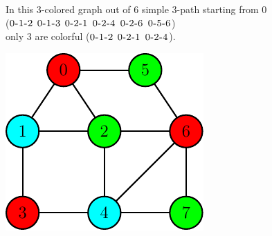 	\begin{minipage}{0.55\textwidth}\raggedright
		\begin{esempio}
		\end{esempio}
		
		In this $3$-colored graph out of $6$ simple $3$-path starting from $0$\\
		($\textsc{0-1-2}$ $\textsc{0-1-3}$ $\textsc{0-2-1}$ $\textsc{0-2-4}$ $\textsc{0-2-6}$ $\textsc{0-5-6}$)\\ 
		only $3$ are colorful ($\textsc{0-1-2}$ $\textsc{0-2-1}$ $\textsc{0-2-4}$).
	\end{minipage}
	\begin{minipage}{0.35\textwidth}
		\includegraphics[width=\linewidth]{figure/figure-2-6}
	\end{minipage}

\noindent
\\

\clearpage
